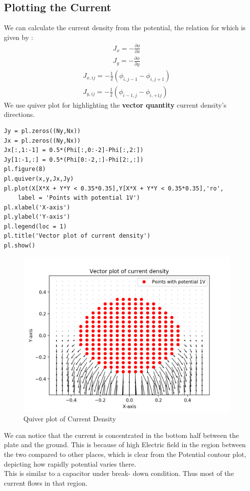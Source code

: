 \documentclass[11pt, a4paper]{article}
\begin{document}
\subsection{Plotting the Current }
We can calculate the current density from the potential, the relation for which is given by :
\begin{equation}\label{eq:7}
\begin{aligned}
J_x = -\frac{\partial \phi}{\partial x}  \\
J_y = -\frac{\partial \phi}{\partial y}
\end{aligned}
\end{equation}
\begin{equation}\label{eq:8}
\begin{aligned}
J_{x,ij} = -\frac{1}{2} (\phi_{i,j-1} - \phi_{i,j+1}) \\
J_{y,ij} = -\frac{1}{2} (\phi_{i-1,j} - \phi_{i,+1j})
\end{aligned}
\end{equation}
We use quiver plot for highlighting the \textbf{vector quantity} current density's directions.
\begin{verbatim}
Jy = pl.zeros((Ny,Nx))
Jx = pl.zeros((Ny,Nx))
Jx[:,1:-1] = 0.5*(Phi[:,0:-2]-Phi[:,2:])
Jy[1:-1,:] = 0.5*(Phi[0:-2,:]-Phi[2:,:])
pl.figure(8)
pl.quiver(x,y,Jx,Jy)
pl.plot(X[X*X + Y*Y < 0.35*0.35],Y[X*X + Y*Y < 0.35*0.35],'ro',
	label = 'Points with potential 1V')
pl.xlabel('X-axis')
pl.ylabel('Y-axis')
pl.legend(loc = 1)
pl.title('Vector plot of current density')
pl.show()
\end{verbatim}
\begin{figure}[H]
   	\centering
   	\includegraphics[scale=0.5]{vector_curr.png}
   	\caption{Quiver plot of Current Density}
   	\label{fig:vector_curr}
\end{figure}
We can notice that the current is concentrated in the bottom half between the plate and the ground. This is because of high Electric field in the region between the two compared to other places, which is clear from the Potential contour plot, depicting how rapidly potential varies there. 
\\This is similar to a capacitor under break- down condition. Thus most of the current flows in that region.
\end{document}
